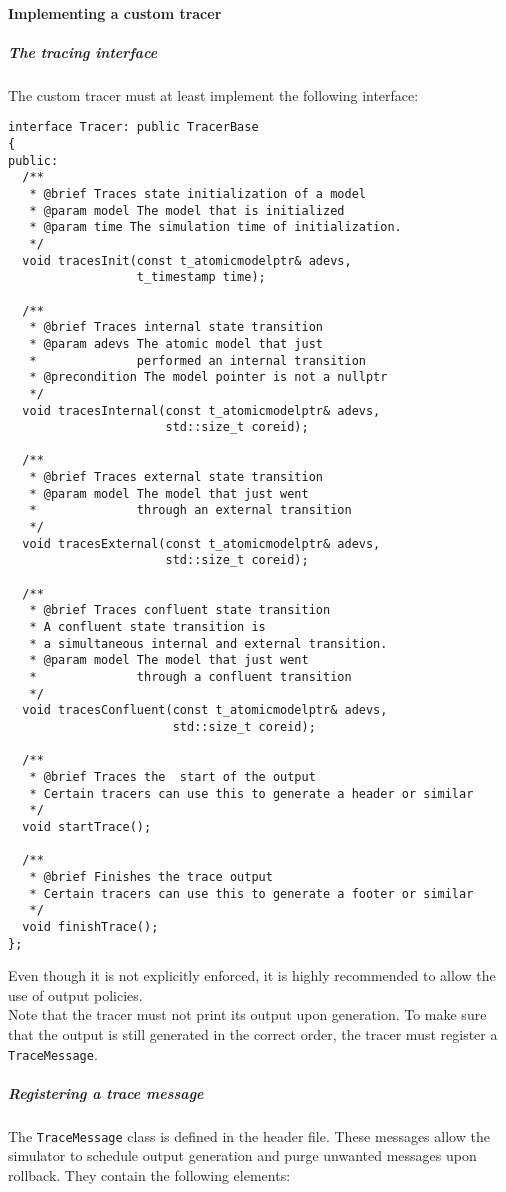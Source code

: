 \paragraph{Implementing a custom tracer}
\subparagraph{The tracing interface}
The custom tracer must at least implement the following interface:
\begin{lstlisting}
interface Tracer: public TracerBase
{
public:
  /**
   * @brief Traces state initialization of a model
   * @param model The model that is initialized
   * @param time The simulation time of initialization.
   */
  void tracesInit(const t_atomicmodelptr& adevs,
                  t_timestamp time);

  /**
   * @brief Traces internal state transition
   * @param adevs The atomic model that just
   *              performed an internal transition
   * @precondition The model pointer is not a nullptr
   */
  void tracesInternal(const t_atomicmodelptr& adevs,
                      std::size_t coreid);

  /**
   * @brief Traces external state transition
   * @param model The model that just went
   *              through an external transition
   */
  void tracesExternal(const t_atomicmodelptr& adevs,
                      std::size_t coreid);

  /**
   * @brief Traces confluent state transition
   * A confluent state transition is
   * a simultaneous internal and external transition.
   * @param model The model that just went
   *              through a confluent transition
   */
  void tracesConfluent(const t_atomicmodelptr& adevs,
                       std::size_t coreid);

  /**
   * @brief Traces the  start of the output
   * Certain tracers can use this to generate a header or similar
   */
  void startTrace();
  
  /**
   * @brief Finishes the trace output
   * Certain tracers can use this to generate a footer or similar
   */
  void finishTrace();
};
\end{lstlisting}
Even though it is not explicitly enforced, it is highly recommended to allow the use of output policies.\\
Note that the tracer must not print its output upon generation. To make sure that the output is still generated in the correct order, the tracer must register a \lstinline{TraceMessage}.
\subparagraph{Registering a trace message}
The \lstinline{TraceMessage} class is defined in the  header file. These messages allow the simulator to schedule output generation and purge unwanted messages upon rollback. They contain the following elements:
